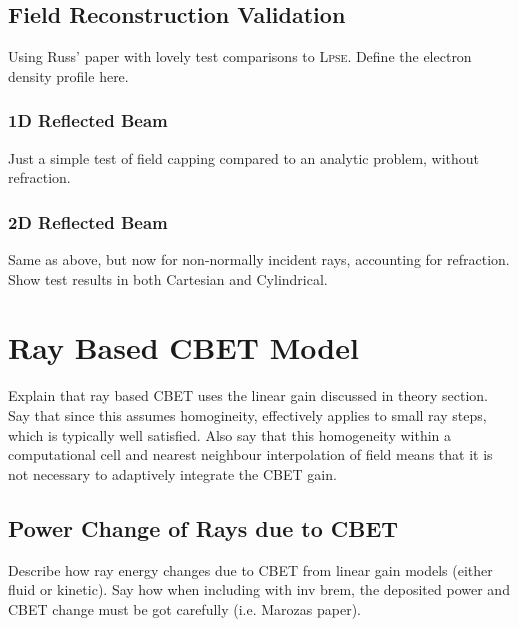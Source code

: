 \subsection{Field Reconstruction Validation}
Using Russ' paper with lovely test comparisons to \textsc{Lpse}.
Define the electron density profile here.

\subsubsection{1D Reflected Beam}
Just a simple test of field capping compared to an analytic problem, without refraction.

\subsubsection{2D Reflected Beam}
Same as above, but now for non-normally incident rays, accounting for refraction.
Show test results in both Cartesian and Cylindrical.


\section{Ray Based CBET Model}

Explain that ray based CBET uses the linear gain discussed in theory section.
Say that since this assumes homogineity, effectively applies to small ray steps, which is typically well satisfied.
Also say that this homogeneity within a computational cell and nearest neighbour interpolation of field means that it is not necessary to adaptively integrate the CBET gain.

\subsection{Power Change of Rays due to CBET}

Describe how ray energy changes due to CBET from linear gain models (either fluid or kinetic).
Say how when including with inv brem, the deposited power and CBET change must be got carefully (i.e. Marozas paper).

